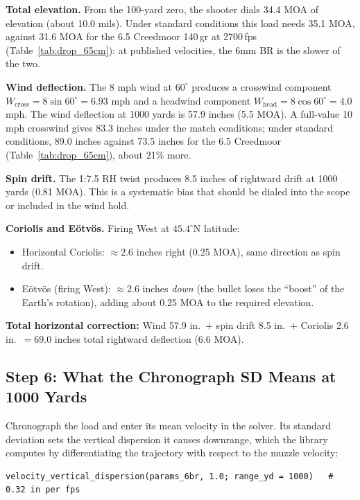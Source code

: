 \documentclass[11pt,twoside,openright]{report}
\begin{document}
\textbf{Total elevation.} From the 100-yard zero, the shooter dials 34.4 MOA of elevation (about 10.0 mils). Under standard conditions this load needs 35.1 MOA, against 31.6 MOA for the 6.5 Creedmoor 140\,gr at 2700\,fps (Table~\ref{tab:drop_65cm}): at published velocities, the 6mm BR is the slower of the two.

\textbf{Wind deflection.} The 8 mph wind at $60^{\circ}$ produces a crosswind component $W_{\mathrm{cross}} = 8 \sin 60^{\circ} = 6.93$ mph and a headwind component $W_{\mathrm{head}} = 8 \cos 60^{\circ} = 4.0$ mph. The wind deflection at 1000 yards is 57.9 inches (5.5 MOA). A full-value 10 mph crosswind gives 83.3 inches under the match conditions; under standard conditions, 89.0 inches against 73.5 inches for the 6.5 Creedmoor (Table~\ref{tab:drop_65cm}), about 21\% more.

\textbf{Spin drift.} The 1:7.5 RH twist produces 8.5 inches of rightward drift at 1000 yards (0.81 MOA). This is a systematic bias that should be dialed into the scope or included in the wind hold.

\textbf{Coriolis and E\"otv\"os.} Firing West at $45.4^{\circ}$N latitude:
\begin{itemize}[nosep]
  \item Horizontal Coriolis: $\approx 2.6$ inches right (0.25 MOA), same direction as spin drift.
  \item E\"otv\"os (firing West): $\approx 2.6$ inches \emph{down} (the bullet loses the ``boost'' of the Earth's rotation), adding about 0.25 MOA to the required elevation.
\end{itemize}

\textbf{Total horizontal correction:} Wind 57.9 in.\ $+$ spin drift 8.5 in.\ $+$ Coriolis 2.6 in.\ $= 69.0$ inches total rightward deflection (6.6 MOA).

\subsection{Step 6: What the Chronograph SD Means at 1000 Yards}

Chronograph the load and enter its mean velocity in the solver. Its standard deviation sets the vertical dispersion it causes downrange, which the library computes by differentiating the trajectory with respect to the muzzle velocity:

\begin{lstlisting}
velocity_vertical_dispersion(params_6br, 1.0; range_yd = 1000)   # 0.32 in per fps
\end{lstlisting}
\end{document}
